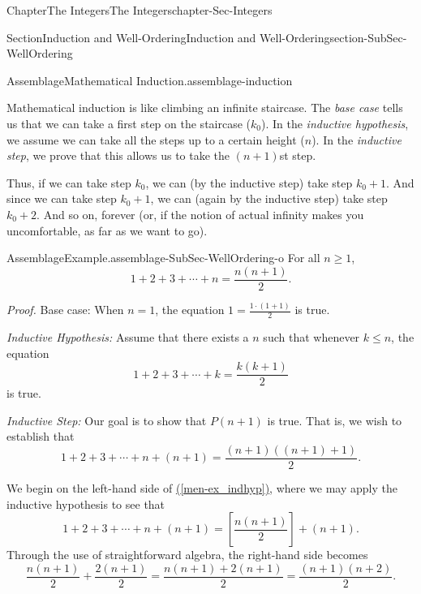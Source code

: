 \documentclass[oneside,10pt,]{book}
\newcommand{\xreffont}{\relax}
\numberwithin{equation}{section}
\renewcommand{\le}{\leqslant}
\renewcommand{\ge}{\geqslant}
\begin{document}
\begin{chapterptx}{Chapter}{The Integers}{}{The Integers}{}{}{chapter-Sec-Integers}
\begin{sectionptx}{Section}{Induction and Well-Ordering}{}{Induction and Well-Ordering}{}{}{section-SubSec-WellOrdering}
\begin{assemblage}{Assemblage}{Mathematical Induction.}{assemblage-induction}
\end{assemblage}
%
Mathematical induction is like climbing an infinite staircase. The \emph{base case} tells us that we can take a first step on the staircase (\(k_0\)). In the \emph{inductive hypothesis}, we assume we can take all the steps up to a certain height (\(n\)). In the \emph{inductive step}, we prove that this allows us to take the \((n+1)\)st step.%
\par
Thus, if we can take step \(k_0\), we can (by the inductive step) take step \(k_0 + 1\). And since we can take step \(k_0 + 1\), we can (again by the inductive step) take step \(k_0 + 2\). And so on, forever (or, if the notion of actual infinity makes you uncomfortable, as far as we want to go).%
\begin{assemblage}{Assemblage}{Example.}{assemblage-SubSec-WellOrdering-o}%
For all \(n \ge 1\),%
\begin{equation*}
1+ 2 + 3 + \cdots + n = \frac{n(n+1)}{2}\text{.}
\end{equation*}
%
\par
\emph{Proof.} Base case: When \(n = 1\), the equation \(1 = \frac{1\cdot (1+1)}{2}\) is true.%
\par
\emph{Inductive Hypothesis:} Assume that there exists a \(n\) such that whenever \(k \le n\), the equation%
\begin{equation}
1+ 2 + 3 + \cdots + k = \frac{k(k+1)}{2}\label{men-ex_indhyp}
\end{equation}
is true.%
\par
\emph{Inductive Step:} Our goal is to show that \(P(n+1)\) is true. That is, we wish to establish that%
\begin{equation}
1+ 2 + 3 + \cdots + n + (n+1) = \frac{(n+1)((n+1)+1)}{2}\text{.}\label{men-ex_indgoal}
\end{equation}
%
\par
We begin on the left-hand side of \hyperref[men-ex_indhyp]{({\xreffont\ref{men-ex_indhyp}})}, where we may apply the inductive hypothesis to see that%
\begin{equation}
1+ 2 + 3 + \cdots + n + (n+1) = \left[\frac{n(n+1)}{2}\right] + (n+1)\text{.}\label{men-ex_indstep1}
\end{equation}
Through the use of straightforward algebra, the right-hand side becomes%
\begin{equation}
\frac{n(n+1)}{2} + \frac{2(n+1)}{2} = \frac{n(n+1) + 2(n+1)}{2} = \frac{(n+1)(n+2)}{2}\text{.}\label{men-ex_indstep2}

\end{equation}
\end{assemblage}
\end{sectionptx}
\end{chapterptx}
\end{document}
